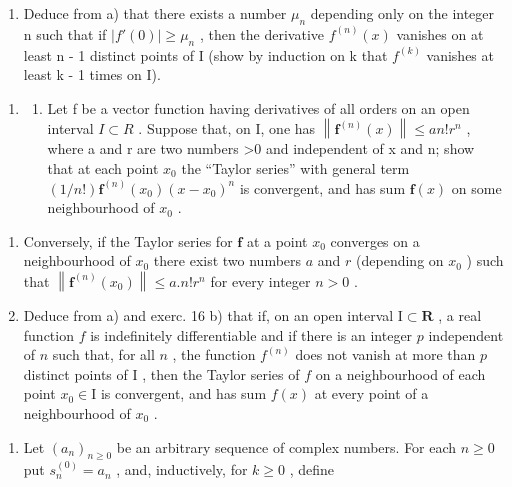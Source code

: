 \begin{enumerate}
\def\labelenumi{\alph{enumi})}
\setcounter{enumi}{1}
\tightlist
\item
  Deduce from a) that there exists a number \(\mu_{n}\) depending only on the integer n such that if \(|f'(0)| \geqslant \mu_{n}\) , then the derivative \(f^{(n)}(x)\) vanishes on at least n - 1 distinct points of I (show by induction on k that \(f^{(k)}\) vanishes at least k - 1 times on I).
\end{enumerate}

\begin{enumerate}
\def\labelenumi{\arabic{enumi})}
\setcounter{enumi}{16}
\tightlist
\item
  \begin{enumerate}
  \def\labelenumii{\alph{enumii})}
  \tightlist
  \item
    Let f be a vector function having derivatives of all orders on an open interval \(I \subset R\) . Suppose that, on I, one has \(\left\|\mathbf{f}^{(n)}(x)\right\| \leqslant a n!r^n\) , where a and r are two numbers \textgreater0 and independent of x and n; show that at each point \(x_0\) the ``Taylor series'' with general term \((1/n!) \mathbf{f}^{(n)}(x_0)(x - x_0)^n\) is convergent, and has sum \(\mathbf{f}(x)\) on some neighbourhood of \(x_0\) .
  \end{enumerate}
\end{enumerate}

\begin{enumerate}
\def\labelenumi{\alph{enumi})}
\setcounter{enumi}{1}
\item
  Conversely, if the Taylor series for \(\mathbf{f}\) at a point \(x_0\) converges on a neighbourhood of \(x_0\) there exist two numbers \(a\) and \(r\) (depending on \(x_0\) ) such that \(\left\| \mathbf{f}^{(n)}(x_0)\right\| \leqslant a.n!r^n\) for every integer \(n > 0\) .
\item
  Deduce from a) and exerc. 16 b) that if, on an open interval \(\mathrm{I} \subset \mathbf{R}\) , a real function \(f\) is indefinitely differentiable and if there is an integer \(p\) independent of \(n\) such that, for all \(n\) , the function \(f^{(n)}\) does not vanish at more than \(p\) distinct points of \(\mathrm{I}\) , then the Taylor series of \(f\) on a neighbourhood of each point \(x_0 \in \mathrm{I}\) is convergent, and has sum \(f(x)\) at every point of a neighbourhood of \(x_0\) .
\end{enumerate}

\begin{enumerate}
\def\labelenumi{\arabic{enumi})}
\setcounter{enumi}{17}
\tightlist
\item
  Let \((a_{n})_{n\geqslant 0}\) be an arbitrary sequence of complex numbers. For each \(n\geqslant 0\) put \(s_n^{(0)} = a_n\) , and, inductively, for \(k\geqslant 0\) , define
\end{enumerate}

